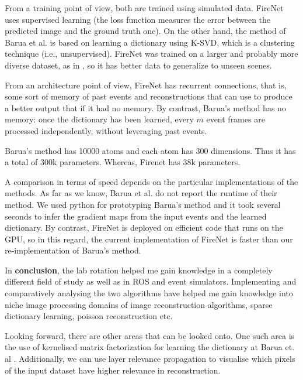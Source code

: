 \documentclass[10pt]{report}
\begin{document}
From a training point of view, both are trained using simulated data. 
FireNet uses supervised learning (the loss function measures the error between the predicted image and the ground truth one).
On the other hand, the method of Barua et al. is based on learning a dictionary using K-SVD, which is a clustering technique (i.e., unsupervised).
FireNet was trained on a larger and probably more diverse dataset, as in \cite{Rebecq19pami}, so it has better data to generalize to unseen scenes.

From an architecture point of view, FireNet has recurrent connections, that is, some sort of memory of past events and reconstructions that can use to produce a better output that if it had no memory. 
By contrast, Barua's method has no memory: once the dictionary has been learned, every $m$ event frames are processed independently, without leveraging past events.
 
Barua's method \cite{Barua16wacv} has 10000 atoms and each atom has 300 dimensions. Thus it has a total of 300k parameters. Whereas, Firenet \cite{Scheerlinck20wacv} has 38k parameters. 

A comparison in terms of speed depends on the particular implementations of the methods.
As far as we know, Barua et al. \cite{Barua16wacv} do not report the runtime of their method.
We used python for prototyping Barua's method and it took several seconds to infer the gradient maps from the input events and the learned dictionary.
By contrast, FireNet is deployed on efficient code that runs on the GPU, so in this regard, the current implementation of FireNet is faster than our re-implementation of Barua's method.

In \textbf{conclusion}, the lab rotation helped me gain knowledge in a completely different field of study as well as in ROS and event simulators. Implementing and comparatively analysing the two algorithms have helped me gain knowledge into niche image processing domains of image reconstruction algorithms, sparse dictionary learning, poisson reconstruction etc.

Looking forward, there are other areas that can be looked onto. One such area is the use of kernelised matrix factorization \cite{fan20arxiv} for learning the dictionary at Barua et. al \cite{Barua16wacv}.
Additionally, we can use layer relevance propagation \cite{Montavon19sip} to visualise which pixels of the input dataset have higher relevance in reconstruction.

\clearpage%


\end{document}
